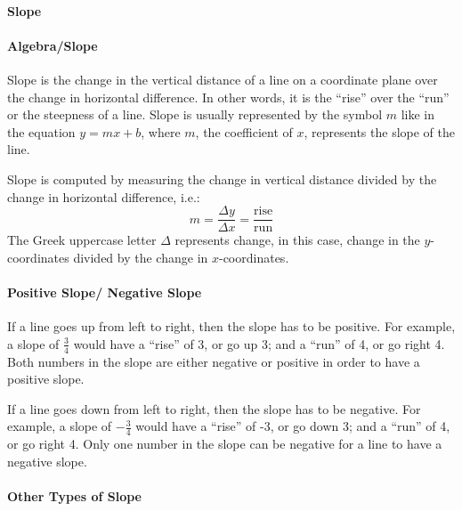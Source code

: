 \paragraph{Slope}



\paragraph{Algebra/Slope}



Slope is the change in the vertical distance of a line on a coordinate plane over the change in horizontal difference. In other words, it is the “rise” over the “run” or the steepness of a line. Slope is usually represented by the symbol $m$ like in the equation $y = mx + b$, where $m$, the coefficient of $x$, represents the slope of the line.



Slope is computed by measuring the change in vertical distance divided by the change in horizontal difference, i.e.:
$$
m = \frac{\Delta y}{\Delta x} = \frac{\text{rise}}{\text{run}}
$$
The Greek uppercase letter $\Delta$ represents change, in this case, change in the $y$-coordinates divided by the change in $x$-coordinates.



\paragraph{Positive Slope/ Negative Slope}



If a line goes up from left to right, then the slope has to be positive. For example, a slope of $\frac{3}{4}$ would have a “rise” of 3, or go up 3; and a “run” of 4, or go right 4. Both numbers in the slope are either negative or positive in order to have a positive slope.



If a line goes down from left to right, then the slope has to be negative. For example, a slope of $-\frac{3}{4}$ would have a “rise” of -3, or go down 3; and a “run” of 4, or go right 4. Only one number in the slope can be negative for a line to have a negative slope.



\paragraph{Other Types of Slope}



